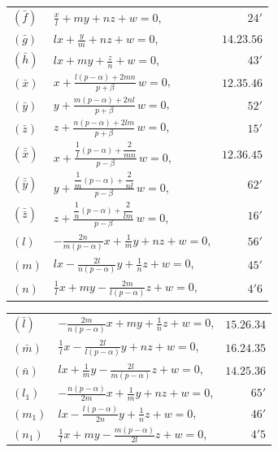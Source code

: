 \documentclass[12pt,a4paper]{article}
\begin{document}
\begin{center}
\begin{tabular}{@{}l@{\qquad}l@{\qquad}r@{}}
$(\bar{f})$ & $\displaystyle \frac{x}{l} + my + nz + w = 0$, & $24'$ \\[4pt]
$(\bar{g})$ & $\displaystyle lx + \frac{y}{m} + nz + w = 0$, & $14.23.56$ \\[4pt]
$(\bar{h})$ & $\displaystyle lx + my + \frac{z}{n} + w = 0$, & $43'$ \\[4pt]
$(\bar{x})$ & $\displaystyle x + \frac{l(p - \alpha) + 2mn}{p + \beta}\,w = 0$, & $12.35.46$ \\[4pt]
$(\bar{y})$ & $\displaystyle y + \frac{m(p - \alpha) + 2nl}{p + \beta}\,w = 0$, & $52'$ \\[4pt]
$(\bar{z})$ & $\displaystyle z + \frac{n(p - \alpha) + 2lm}{p + \beta}\,w = 0$, & $15'$ \\[4pt]
$(\bar{\bar{x}})$ & $\displaystyle x + \frac{\dfrac{1}{l}(p - \alpha) + \dfrac{2}{mn}}{p - \beta}\,w = 0$, & $12.36.45$ \\[4pt]
$(\bar{\bar{y}})$ & $\displaystyle y + \frac{\dfrac{1}{m}(p - \alpha) + \dfrac{2}{nl}}{p - \beta}\,w = 0$, & $62'$ \\[4pt]
$(\bar{\bar{z}})$ & $\displaystyle z + \frac{\dfrac{1}{n}(p - \alpha) + \dfrac{2}{lm}}{p - \beta}\,w = 0$, & $16'$ \\[4pt]
$(l)$ & $\displaystyle -\frac{2n}{m(p - \alpha)}x + \frac{1}{m}y + nz + w = 0$, & $56'$ \\[4pt]
$(m)$ & $\displaystyle lx - \frac{2l}{n(p - \alpha)}y + \frac{1}{n}z + w = 0$, & $45'$ \\[4pt]
$(n)$ & $\displaystyle \frac{1}{l}x + my - \frac{2m}{l(p - \alpha)}z + w = 0$, & $4'6$
\end{tabular}
\end{center}

\begin{center}
\begin{tabular}{@{}l@{\qquad}l@{\qquad}r@{}}
$(\bar{l})$ & $\displaystyle -\frac{2m}{n(p - \alpha)}x + my + \frac{1}{n}z + w = 0$, & $15.26.34$ \\[4pt]
$(\bar{m})$ & $\displaystyle \frac{1}{l}x - \frac{2l}{l(p - \alpha)}y + nz + w = 0$, & $16.24.35$ \\[4pt]
$(\bar{n})$ & $\displaystyle lx + \frac{1}{m}y - \frac{2l}{m(p - \alpha)}z + w = 0$, & $14.25.36$ \\[4pt]
$(l_1)$ & $\displaystyle -\frac{n(p - \alpha)}{2m}x + \frac{1}{m}y + nz + w = 0$, & $65'$ \\[4pt]
$(m_1)$ & $\displaystyle lx - \frac{l(p - \alpha)}{2n}y + \frac{1}{n}z + w = 0$, & $46'$ \\[4pt]
$(n_1)$ & $\displaystyle \frac{1}{l}x + my - \frac{m(p - \alpha)}{2l}z + w = 0$, & $4'5$
\end{tabular}
\end{center}
\end{document}
